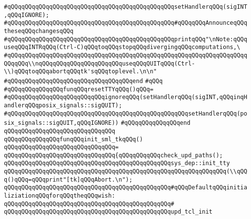 \verb|#qQQqqQQqqQQqqQQqqQQqqQQqqQQqqQQqqQQqqQQqqQQqqQQqsetHandlerqQQq(sigINT,qQQqIGNORE);|\newline
\verb|#qQQqqQQqqQQqqQQqqQQqqQQqqQQqqQQqqQQqqQQqqQQqqQQq#qQQqqQQqAnnounceqQQqtheseqQQqchangesqQQq|\newline
\verb|#qQQqqQQqqQQqqQQqqQQqqQQqqQQqqQQqqQQqqQQqqQQqqQQqprintqQQq"\nNote:qQQquseqQQqINTRqQQq(Ctrl-C)qQQqtoqQQqstopqQQqdivergingqQQqcomputations,\|\newline
\verb|#qQQqqQQqqQQqqQQqqQQqqQQqqQQqqQQqqQQqqQQqqQQqqQQqqQQqqQQqqQQqqQQqqQQqqQQqqQQq\\nqQQqqQQqqQQqqQQqqQQqqQQquseqQQqQUITqQQq(Ctrl-\\)qQQqtoqQQqabortqQQqtk'sqQQqtoplevel.\n\n"|\newline
\verb|#qQQqqQQqqQQqqQQqqQQqqQQqqQQqqQQqqQQqend|\newline
\verb|#qQQq|\newline
\verb|#qQQqqQQqqQQqqQQqfunqQQqresetTTYqQQq()qQQq=|\newline
\verb|#qQQqqQQqqQQqqQQqqQQqqQQqqQQqignoreqQQq(setHandlerqQQq(sigINT,qQQqinqHandlerqQQqposix_signals::sigQUIT);|\newline
\verb|#qQQqqQQqqQQqqQQqqQQqqQQqqQQqqQQqqQQqqQQqqQQqqQQqqQQqsetHandlerqQQq(posix_signals::sigQUIT,qQQqIGNORE))|\newline
\verb|#qQQqqQQqqQQqqQQqend|\newline
\newline
\verb|qQQqqQQqqQQqqQQqqQQqqQQqqQQqqQQq|\newline
\verb|qQQqqQQqqQQqqQQqfunqQQqinit_sml_tkqQQq()|\newline
\verb|qQQqqQQqqQQqqQQqqQQqqQQqqQQqqQQq=|\newline
\verb|qQQqqQQqqQQqqQQqqQQqqQQqqQQqqQQq{qQQqqQQqqQQqcheck_upd_paths();|\newline
\newline
\verb|qQQqqQQqqQQqqQQqqQQqqQQqqQQqqQQqqQQqqQQqqQQqqQQqsys_dep::init_tty|\newline
\verb|qQQqqQQqqQQqqQQqqQQqqQQqqQQqqQQqqQQqqQQqqQQqqQQqqQQqqQQqqQQqqQQq(\\qQQq()qQQq=qQQqprint"[tk]qQQqAbort.\n");|\newline
\newline
\verb|qQQqqQQqqQQqqQQqqQQqqQQqqQQqqQQqqQQqqQQqqQQqqQQq#qQQqDefaultqQQqinitializiationqQQqforqQQqtheqQQqwish:|\newline
\verb|qQQqqQQqqQQqqQQqqQQqqQQqqQQqqQQqqQQqqQQqqQQqqQQq#|\newline
\verb|qQQqqQQqqQQqqQQqqQQqqQQqqQQqqQQqqQQqqQQqqQQqqQQqupd_tcl_init|\newline
